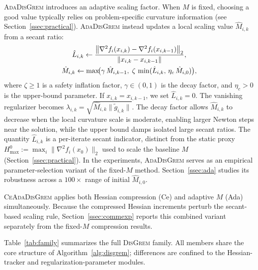 \documentclass[review,onefignum,onetabnum]{siamart171218}
\begin{document}
	\textsc{AdaDisGrem} introduces an adaptive scaling factor.
	When $M$ is fixed, choosing a good value typically relies on
	problem-specific curvature information (see Section~\ref{ssec:practical}).
	\textsc{AdaDisGrem} instead updates a local scaling value
	$\hat M_{i,k}$ from a secant ratio:
	\begin{gather*}
		\hat L_{i,k}\gets
		\frac{\left\|\nabla^2 f_i(x_{i,k})-\nabla^2 f_i(x_{i,k-1})\right\|_2}
		{\left\|x_{i,k}-x_{i,k-1}\right\|},\\
		\hat M_{i,k}\gets \max\!\bigl(\gamma\,\hat M_{i,k-1},\;
		\zeta\,\min(\hat L_{i,k},\,\eta_c\,\hat M_{i,0})\bigr),
	\end{gather*}
	where $\zeta\ge1$ is a safety inflation factor, $\gamma\in(0,1)$ is
	the decay factor, and $\eta_c>0$ is the upper-bound parameter.
	If $x_{i,k}=x_{i,k-1}$, we set $\hat L_{i,k}=0$.
	The vanishing regularizer becomes $\lambda_{i,k}=\sqrt{\hat M_{i,k}\|\tilde g_{i,k}\|}$.
	The decay factor allows $\hat M_{i,k}$ to decrease when the local
	curvature scale is moderate, enabling larger Newton steps near the
	solution, while the upper bound damps isolated large secant ratios.
	The quantity $\hat L_{i,k}$ is a per-iterate secant
	indicator, distinct from the static proxy
	$H_{\max}^0 := \max_i\|\nabla^2 f_i(x_0)\|_2$ used to
	scale the baseline $M$ (Section~\ref{ssec:practical}).
	In the experiments, \textsc{AdaDisGrem} serves as an empirical
	parameter-selection variant of the fixed-$M$ method.
	Section~\ref{ssec:ada} studies its robustness across a $100\times$
	range of initial
	$\hat M_{i,0}$.
	
	\textsc{CeAdaDisGrem} applies both Hessian compression (Ce) and
	adaptive $M$ (Ada) simultaneously.
	Because the compressed Hessian increments perturb the secant-based
	scaling rule, Section~\ref{ssec:commexp} reports this combined variant
	separately from the fixed-$M$ compression results.
	
	Table~\ref{tab:family} summarizes the full \textsc{DisGrem} family.
	All members share the core structure of Algorithm~\ref{alg:disgrem};
	differences are confined to the Hessian-tracker and
	regularization-parameter modules.
	
\end{document}
